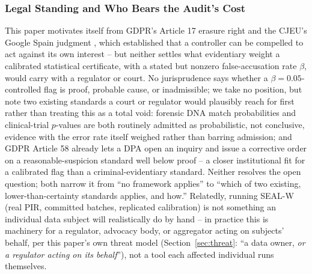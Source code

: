 \documentclass[10pt,journal,compsoc]{IEEEtran}
\begin{document}
\subsubsection{Legal Standing and Who Bears the Audit's Cost}

This paper motivates itself from GDPR's Article 17 erasure right \cite{gdpr2016} and the CJEU's Google Spain judgment \cite{googlespain2014}, which established that a controller can be compelled to act against its own interest -- but neither settles what evidentiary weight a calibrated statistical certificate, with a stated but nonzero false-accusation rate $\beta$, would carry with a regulator or court. No jurisprudence says whether a $\beta{=}0.05$-controlled flag is proof, probable cause, or inadmissible; we take no position, but note two existing standards a court or regulator would plausibly reach for first rather than treating this as a total void: forensic DNA match probabilities and clinical-trial $p$-values are both routinely admitted as probabilistic, not conclusive, evidence with the error rate itself weighed rather than barring admission; and GDPR Article 58 already lets a DPA open an inquiry and issue a corrective order on a reasonable-suspicion standard well below proof -- a closer institutional fit for a calibrated flag than a criminal-evidentiary standard. Neither resolves the open question; both narrow it from ``no framework applies'' to ``which of two existing, lower-than-certainty standards applies, and how.'' Relatedly, running SEAL-W (real PIR, committed batches, replicated calibration) is not something an individual data subject will realistically do by hand -- in practice this is machinery for a regulator, advocacy body, or aggregator acting on subjects' behalf, per this paper's own threat model (Section~\ref{sec:threat}: ``a data owner, \emph{or a regulator acting on its behalf}''), not a tool each affected individual runs themselves.
\end{document}
